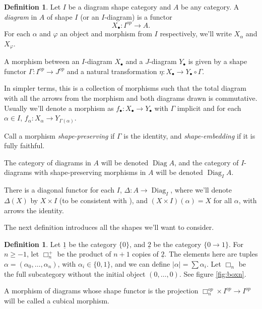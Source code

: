 \documentclass{report}
\theoremstyle{definition}
\newtheorem{definition}[theorem]{Definition}
\DeclareMathOperator{\Diag}{Diag}
\newcommand{\tu}{\underline{2}}
\begin{document}
\begin{definition}
	\label{def:diagram}
	Let $I$ be a diagram shape category and $A$ be any category.
	A \textit{diagram} in $A$ of shape $I$ (or an $I$-diagram) is a functor
	\[
		X_\bullet : I^{op} \rightarrow A.
	\]
	For each $\alpha$ and $\varphi$ an object and morphism from $I$ respectively, we'll write $X_\alpha$ and $X_\varphi$.
	
	A morphism between an $I$-diagram $X_\bullet$ and a $J$-diagram $Y_\bullet$ is given by a shape functor $\Gamma : I^{op} \rightarrow J^{op}$ and a natural transformation $\eta : X_\bullet \rightarrow Y_\bullet \circ \Gamma$.
	
	In simpler terms, this is a collection of morphisms such that the total diagram with all the arrows from the morphism and both diagrams drawn is commutative.
	Usually we'll denote a morphism as $f_\bullet : X_\bullet \rightarrow Y_\bullet$ with $\Gamma$ implicit and for each $\alpha \in I$, $f_\alpha : X_\alpha \rightarrow Y_{\Gamma(\alpha)}$.
	
	Call a morphism \textit{shape-preserving} if $\Gamma$ is the identity, and \textit{shape-embedding} if it is fully faithful.
	
	The category of diagrams in $A$ will be denoted $\Diag A$, and the category of $I$-diagrams with shape-preserving morphisms in $A$ will be denoted $\Diag_I A$.
	
	There is a diagonal functor for each $I$, $\Delta : A \rightarrow \Diag_I$, where we'll denote $\Delta(X)$ by $X \times I$ (to be consistent with \cite{Guillen1988}), and $(X \times I)(\alpha) = X$ for all $\alpha$, with arrows the identity.
\end{definition}

The next definition introduces all the shapes we'll want to consider.

\begin{definition}
	Let $\underline{1}$ be the category $\{0\}$, and $\tu$ be the category $\{0 \rightarrow 1\}$.
	For $n \geq -1$, let $\Box_n^+$ be the product of $n+1$ copies of $\tu$.
	The elements here are tuples $\alpha = (\alpha_0, \dots, \alpha_n)$, with $\alpha_i \in \{0, 1\}$, and we can define $|\alpha| = \sum \alpha_i$.
	Let $\Box_n$ be the full subcategory without the initial object $(0, \dots, 0)$.
	See figure \ref{fig:boxn}.
	
	A morphism of diagrams whose shape functor is the projection $\Box_n^{op} \times I^{op} \rightarrow I^{op}$ will be called a cubical morphism.
\end{definition}
\end{document}
